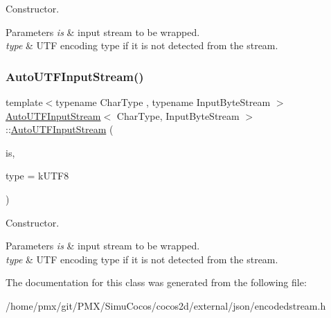 Constructor. 


\begin{DoxyParams}{Parameters}
{\em is} & input stream to be wrapped. \\
\hline
{\em type} & U\+TF encoding type if it is not detected from the stream. \\
\hline
\end{DoxyParams}
\mbox{\label{classAutoUTFInputStream_a83837fced0971ba26dd9a8ec1575abb0}} 
\subsubsection{\texorpdfstring{Auto\+U\+T\+F\+Input\+Stream()}{AutoUTFInputStream()}\hspace{0.1cm}{\footnotesize\ttfamily [2/2]}}
{\footnotesize\ttfamily template$<$typename Char\+Type , typename Input\+Byte\+Stream $>$ \\
\hyperlink{classAutoUTFInputStream}{Auto\+U\+T\+F\+Input\+Stream}$<$ Char\+Type, Input\+Byte\+Stream $>$\+::\hyperlink{classAutoUTFInputStream}{Auto\+U\+T\+F\+Input\+Stream} (\begin{DoxyParamCaption}\item[{Input\+Byte\+Stream \&}]{is,  }\item[{U\+T\+F\+Type}]{type = {\ttfamily kUTF8} }\end{DoxyParamCaption})\hspace{0.3cm}{\ttfamily [inline]}}



Constructor. 


\begin{DoxyParams}{Parameters}
{\em is} & input stream to be wrapped. \\
\hline
{\em type} & U\+TF encoding type if it is not detected from the stream. \\
\hline
\end{DoxyParams}


The documentation for this class was generated from the following file\+:\begin{DoxyCompactItemize}
\item 
/home/pmx/git/\+P\+M\+X/\+Simu\+Cocos/cocos2d/external/json/encodedstream.\+h\end{DoxyCompactItemize}
